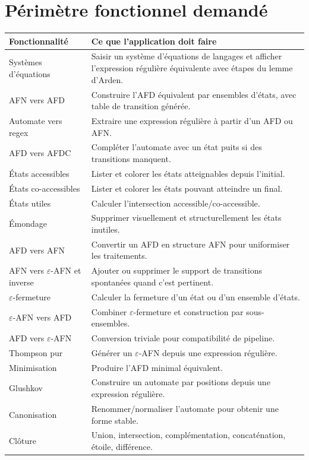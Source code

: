 \documentclass[11pt,a4paper]{report}
\newcommand{\eps}{\ensuremath{\varepsilon}}
\begin{document}
\section{Périmètre fonctionnel demandé}
\begin{longtable}{p{}p{}}
\toprule
\textbf{Fonctionnalité} & \textbf{Ce que l'application doit faire}\\
\midrule
Systèmes d'équations & Saisir un système d'équations de langages et afficher l'expression régulière équivalente avec étapes du lemme d'Arden.\\
AFN vers AFD & Construire l'AFD équivalent par ensembles d'états, avec table de transition générée.\\
Automate vers regex & Extraire une expression régulière à partir d'un AFD ou AFN.\\
AFD vers AFDC & Compléter l'automate avec un état puits si des transitions manquent.\\
États accessibles & Lister et colorer les états atteignables depuis l'initial.\\
États co-accessibles & Lister et colorer les états pouvant atteindre un final.\\
États utiles & Calculer l'intersection accessible/co-accessible.\\
Émondage & Supprimer visuellement et structurellement les états inutiles.\\
AFD vers AFN & Convertir un AFD en structure AFN pour uniformiser les traitements.\\
AFN vers \eps-AFN et inverse & Ajouter ou supprimer le support de transitions spontanées quand c'est pertinent.\\
\eps-fermeture & Calculer la fermeture d'un état ou d'un ensemble d'états.\\
\eps-AFN vers AFD & Combiner \eps-fermeture et construction par sous-ensembles.\\
AFD vers \eps-AFN & Conversion triviale pour compatibilité de pipeline.\\
Thompson pur & Générer un \eps-AFN depuis une expression régulière.\\
Minimisation & Produire l'AFD minimal équivalent.\\
Glushkov & Construire un automate par positions depuis une expression régulière.\\
Canonisation & Renommer/normaliser l'automate pour obtenir une forme stable.\\
Clôture & Union, intersection, complémentation, concaténation, étoile, différence.\\
\bottomrule
\end{longtable}
\end{document}
